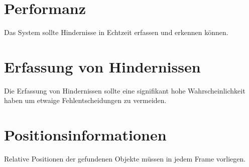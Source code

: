 \section{Performanz}
\label{sec:performanz}

	\begin{anforderung}
	\label{req:performanz}
		Das System sollte Hindernisse in Echtzeit erfassen und erkennen können.
	\end{anforderung}
	


\section{Erfassung von Hindernissen}
\label{sec:erfassung_von_hindernissen}

	\begin{anforderung}
	\label{req:erfassung_von_hindernissen}
		Die Erfassung von Hindernissen sollte eine signifikant hohe Wahrscheinlichkeit haben um etwaige Fehlentscheidungen zu vermeiden.
	\end{anforderung}
	

\section{Positionsinformationen}
\label{sec:positionsinformationen}

	\begin{anforderung}
	\label{req:positionsinformationen}
		Relative Positionen der gefundenen Objekte müssen in jedem Frame vorliegen.
	\end{anforderung}
